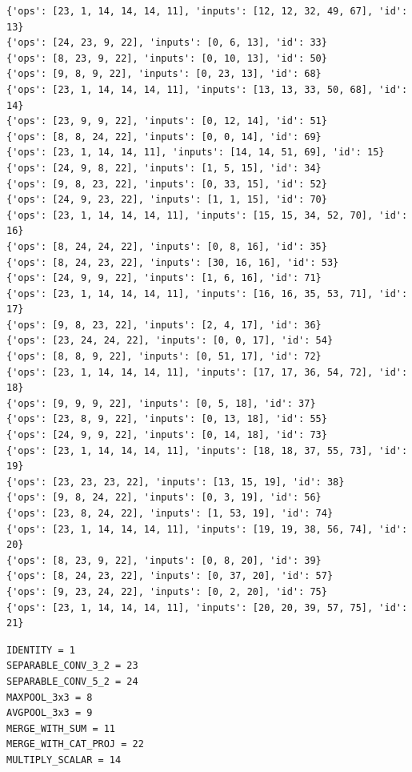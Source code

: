 \documentclass{article}
\begin{document}
\begin{verbatim}
{'ops': [23, 1, 14, 14, 14, 11], 'inputs': [12, 12, 32, 49, 67], 'id': 13}
{'ops': [24, 23, 9, 22], 'inputs': [0, 6, 13], 'id': 33}
{'ops': [8, 23, 9, 22], 'inputs': [0, 10, 13], 'id': 50}
{'ops': [9, 8, 9, 22], 'inputs': [0, 23, 13], 'id': 68}
{'ops': [23, 1, 14, 14, 14, 11], 'inputs': [13, 13, 33, 50, 68], 'id': 14}
{'ops': [23, 9, 9, 22], 'inputs': [0, 12, 14], 'id': 51}
{'ops': [8, 8, 24, 22], 'inputs': [0, 0, 14], 'id': 69}
{'ops': [23, 1, 14, 14, 11], 'inputs': [14, 14, 51, 69], 'id': 15}
{'ops': [24, 9, 8, 22], 'inputs': [1, 5, 15], 'id': 34}
{'ops': [9, 8, 23, 22], 'inputs': [0, 33, 15], 'id': 52}
{'ops': [24, 9, 23, 22], 'inputs': [1, 1, 15], 'id': 70}
{'ops': [23, 1, 14, 14, 14, 11], 'inputs': [15, 15, 34, 52, 70], 'id': 16}
{'ops': [8, 24, 24, 22], 'inputs': [0, 8, 16], 'id': 35}
{'ops': [8, 24, 23, 22], 'inputs': [30, 16, 16], 'id': 53}
{'ops': [24, 9, 9, 22], 'inputs': [1, 6, 16], 'id': 71}
{'ops': [23, 1, 14, 14, 14, 11], 'inputs': [16, 16, 35, 53, 71], 'id': 17}
{'ops': [9, 8, 23, 22], 'inputs': [2, 4, 17], 'id': 36}
{'ops': [23, 24, 24, 22], 'inputs': [0, 0, 17], 'id': 54}
{'ops': [8, 8, 9, 22], 'inputs': [0, 51, 17], 'id': 72}
{'ops': [23, 1, 14, 14, 14, 11], 'inputs': [17, 17, 36, 54, 72], 'id': 18}
{'ops': [9, 9, 9, 22], 'inputs': [0, 5, 18], 'id': 37}
{'ops': [23, 8, 9, 22], 'inputs': [0, 13, 18], 'id': 55}
{'ops': [24, 9, 9, 22], 'inputs': [0, 14, 18], 'id': 73}
{'ops': [23, 1, 14, 14, 14, 11], 'inputs': [18, 18, 37, 55, 73], 'id': 19}
{'ops': [23, 23, 23, 22], 'inputs': [13, 15, 19], 'id': 38}
{'ops': [9, 8, 24, 22], 'inputs': [0, 3, 19], 'id': 56}
{'ops': [23, 8, 24, 22], 'inputs': [1, 53, 19], 'id': 74}
{'ops': [23, 1, 14, 14, 14, 11], 'inputs': [19, 19, 38, 56, 74], 'id': 20}
{'ops': [8, 23, 9, 22], 'inputs': [0, 8, 20], 'id': 39}
{'ops': [8, 24, 23, 22], 'inputs': [0, 37, 20], 'id': 57}
{'ops': [9, 23, 24, 22], 'inputs': [0, 2, 20], 'id': 75}
{'ops': [23, 1, 14, 14, 14, 11], 'inputs': [20, 20, 39, 57, 75], 'id': 21}
\end{verbatim}


\begin{verbatim}
IDENTITY = 1
SEPARABLE_CONV_3_2 = 23
SEPARABLE_CONV_5_2 = 24
MAXPOOL_3x3 = 8
AVGPOOL_3x3 = 9
MERGE_WITH_SUM = 11
MERGE_WITH_CAT_PROJ = 22
MULTIPLY_SCALAR = 14
\end{verbatim}
\end{document}
